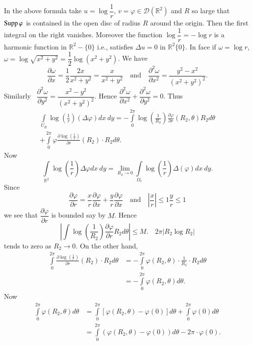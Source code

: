 In the above formula take $u=\log \dfrac{1}{r}$, $v=\varphi\in \mathcal{D}(\mathbb{R}^{2})$ and $R$ so large that $\operatorname{Supp}\varphi$ is contained in the open disc of radius $R$ around the origin. Then the first integral on the right vanishes. Moreover the function $\log \dfrac{1}{r}=-\log r$ is a harmonic function in $\mathbb{R}^{2}-\{0\}$ i.e., satisfies $\Delta u=0$ in $\mathbb{R}^{2}\{0\}$. In face if $\omega=\log r$, $\omega=\log \sqrt{x^{2}+y^{2}}=\dfrac{1}{2}\log (x^{2}+y^{2})$. We have 
$$
\frac{\partial \omega}{\partial x}=\frac{1}{2}\frac{2x}{x^{2}+y^{2}}=\frac{x}{x^{2}+y^{2}}\quad\text{and}\quad \frac{\partial^{2}\omega}{\partial x^{2}}=\dfrac{y^{2}-x^{2}}{(x^{2}+y^{2})^{2}}.
$$
Similarly \ $\dfrac{\partial^{2}\omega}{\partial y^{2}}=\dfrac{x^{2}-y^{2}}{(x^{2}+y^{2})^{2}}$. Hence $\dfrac{\partial^{2}\omega}{\partial x^{2}}+\dfrac{\partial^{2}\omega}{\partial y^{2}}=0$. Thus
\begin{gather*}
\int\limits_{U_{R}}\log \left(\frac{1}{r}\right)(\Delta \varphi)dx \ dy=-\int\limits^{2\pi}_{0}\log \left(\frac{1}{R_{2}}\right)\frac{\partial \varphi}{\partial r}(R_{2},\theta)R_{2}d\theta\\[4pt]
+\int\limits^{2\pi}_{0}\varphi \frac{\partial \log (\frac{1}{r})}{\partial r}(R_{2})\cdot R_{2}d\theta.
\end{gather*}\pageoriginale
Now
$$
\int\limits_{\mathbb{R}^{2}}\log \left(\frac{1}{r}\right)\Delta \varphi dx \ dy =\lim\limits_{R_{2}\to 0}\int\limits_{\Omega_{r}}\log \left(\frac{1}{r}\right)\Delta (\varphi)dx \ dy.
$$
Since 
$$
\frac{\partial \varphi}{\partial r}=\frac{x}{r}\frac{\partial \varphi}{\partial x}+\frac{y}{r}\frac{\partial \varphi}{\partial x}\quad\text{and}\quad \left|\frac{x}{r}\right|\leq 1 \frac{y}{r}\leq 1
$$
we see that $\dfrac{\partial \varphi}{\partial r}$ is bounded say by $M$. Hence
$$
\left| \int \log \left(\frac{1}{R_{2}}\right)\frac{\partial \varphi}{\partial r}R_{2}d\theta\right|\leq M.\quad 2\pi |R_{2}\log R_{2}|
$$
tends to zero as $R_{2}\to 0$. On the other hand,
\begin{align*}
\int\limits^{2\pi}_{0}\frac{\partial \log \left(\frac{1}{r}\right)}{\partial r}(R_{2})\cdot R_{2}d\theta &= -\int\limits^{2\pi}_{0}\varphi(R_{2},\theta)\cdot \frac{1}{R_{2}}\cdot R_{2}d\theta\\[4pt]
&=-\int\limits^{2\pi}_{0}\varphi (R_{2},\theta)d\theta.
\end{align*}
Now
\begin{align*}
\int\limits^{2\pi}_{0}\varphi (R_{2},\theta)d\theta &= \int\limits^{2\pi}_{0}[\varphi(R_{2},\theta)-\varphi(0)]d\theta+\int\limits^{2\pi}_{0}\varphi(0)d\theta\\[4pt]
&= \int\limits^{2\pi}_{0}(\varphi(R_{2},\theta)-\varphi(0))d\theta-2\pi\cdot \varphi(0).
\end{align*}
